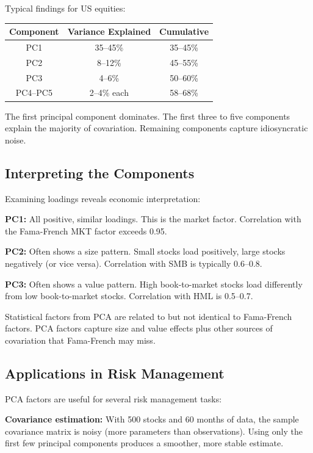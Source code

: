 \documentclass[11pt,a4paper]{article}
\begin{document}
Typical findings for US equities:

\begin{center}
\begin{tabular}{ccc}
\toprule
\textbf{Component} & \textbf{Variance Explained} & \textbf{Cumulative} \\
\midrule
PC1 & 35--45\% & 35--45\% \\
PC2 & 8--12\% & 45--55\% \\
PC3 & 4--6\% & 50--60\% \\
PC4--PC5 & 2--4\% each & 58--68\% \\
\bottomrule
\end{tabular}
\end{center}

The first principal component dominates. The first three to five components explain the majority of covariation. Remaining components capture idiosyncratic noise.

\subsection{Interpreting the Components}

Examining loadings reveals economic interpretation:

\textbf{PC1:} All positive, similar loadings. This is the market factor. Correlation with the Fama-French MKT factor exceeds 0.95.

\textbf{PC2:} Often shows a size pattern. Small stocks load positively, large stocks negatively (or vice versa). Correlation with SMB is typically 0.6--0.8.

\textbf{PC3:} Often shows a value pattern. High book-to-market stocks load differently from low book-to-market stocks. Correlation with HML is 0.5--0.7.

Statistical factors from PCA are related to but not identical to Fama-French factors. PCA factors capture size and value effects plus other sources of covariation that Fama-French may miss.

\subsection{Applications in Risk Management}

PCA factors are useful for several risk management tasks:

\textbf{Covariance estimation:} With 500 stocks and 60 months of data, the sample covariance matrix is noisy (more parameters than observations). Using only the first few principal components produces a smoother, more stable estimate.
\end{document}

